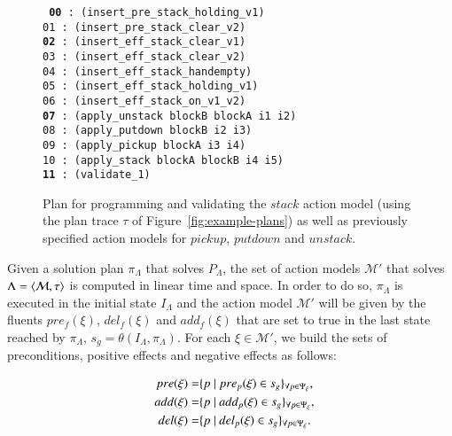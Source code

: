 \begin{figure}[hbt!]
	{\footnotesize\tt
		{\bf 00} : (insert\_pre\_stack\_holding\_v1) \\
		01 : (insert\_pre\_stack\_clear\_v2)\\
		{\bf 02} : (insert\_eff\_stack\_clear\_v1)\\
		03 : (insert\_eff\_stack\_clear\_v2)\\
		04 : (insert\_eff\_stack\_handempty)\\
		05 : (insert\_eff\_stack\_holding\_v1)\\
		06 : (insert\_eff\_stack\_on\_v1\_v2)\\
		{\bf 07} : (apply\_unstack blockB blockA i1 i2)\\
		08 : (apply\_putdown blockB i2 i3)\\
		09 : (apply\_pickup blockA i3 i4)\\
		10 : (apply\_stack blockA blockB i4 i5)\\
		{\bf 11} : (validate\_1)
	}
	\caption{\small Plan for programming and validating the $stack$ action model (using the plan trace $\tau$ of Figure~\ref{fig:example-plans}) as well as previously specified action models for $pickup$, $putdown$ and $unstack$.}
	\label{fig:plan-lplan}
\end{figure}

Given a solution plan $\pi_\Lambda$ that solves $P_{\Lambda}$, the set of action models $\mathcal{M}'$ that solves $\Lambda={\langle \mathcal{M},\tau \rangle}$ is computed in linear time and space. In order to do so, $\pi_\Lambda$ is executed in the initial state $I_{\Lambda}$ and the action model $\mathcal{M}'$ will be given by the fluents $pre_f(\xi)$, $del_f(\xi)$ and $add_f(\xi)$ that are set to true in the last state reached by $\pi_\Lambda$, $s_g=\theta(I_\Lambda,\pi_\Lambda)$. For each $\xi \in \mathcal{M'}$, we build the sets of preconditions, positive effects and negative effects as follows:



\begin{small}
	\begin{align*}
	\hspace*{7pt}pre(\xi)=& \{p ~|~ pre_p(\xi) \in s_g\}_{\forall p \in \Psi_\xi},\\
	\hspace*{7pt}add(\xi)=& \{p ~|~ add_p(\xi) \in s_g\}_{\forall p \in \Psi_\xi},\\
	\hspace*{7pt}del(\xi)=& \{p ~|~ del_p(\xi) \in s_g\}_{\forall p \in \Psi_\xi}.
	\end{align*}
\end{small}

